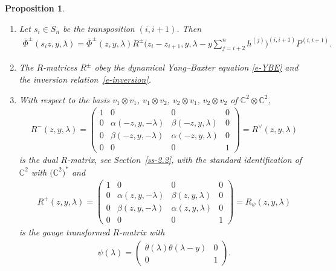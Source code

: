 \documentclass[pdftex]{sigma}
\numberwithin{equation}{section}
\newtheorem{Proposition}[Theorem]{Proposition}
 { \theoremstyle{definition}
\newtheorem{Definition}[Theorem]{Definition}
\newtheorem{Example}[Theorem]{Example}
\newtheorem{Remark}[Theorem]{Remark} }
\begin{document}
\begin{Proposition}\label{prop-3}\quad
\begin{enumerate}\itemsep=0pt
 \item[$(i)$] Let $s_i\in S_n$ be the transposition $(i,i+1)$. Then
 \begin{gather*}
 \bar\Phi^\pm(s_iz,y, \lambda) =\bar\Phi^\pm(z,y,\lambda) R^\pm\bigg(z_i-z_{i+1},y,\lambda -y\sum_{j=i+2}^nh^{(j)}\bigg)^{(i,i+1)}P^{(i,i+1)}.
 \end{gather*}
 \item[$(ii)$] The $R$-matrices $R^\pm$ obey the dynamical Yang--Baxter equation \eqref{e-YBE} and the inversion relation~\eqref{e-inversion}.
 \item[$(iii)$] With respect to the basis $v_1\otimes v_1$, $v_1\otimes v_2$, $v_2\otimes v_1$, $v_2\otimes v_2$ of $\mathbb C^2\otimes \mathbb C^2$,
 \begin{gather*}
 R^-(z,y,\lambda)= \left(
 \begin{matrix}
 1 & 0 & 0 & 0\\
 0 & \alpha(-z,y,-\lambda) & \beta(-z,y,\lambda) & 0\\
 0 & \beta(-z,y,-\lambda) & \alpha(-z,y,\lambda) & 0\\
 0 & 0 & 0& 1
 \end{matrix}
 \right)=R^\vee(z,y,\lambda)
 \end{gather*}
 is the dual $R$-matrix, see Section~{\rm \ref{ss-2.2}}, with the standard identification of $\mathbb C^2$ with $\big(\mathbb C^2\big)^*$ and
 \begin{gather*}
 R^+(z,y,\lambda)= \left(
 \begin{matrix}
 1 & 0 & 0 & 0\\
 0 & \alpha(z,y,-\lambda) & \beta(z,y,\lambda) & 0\\
 0 & \beta(z,y,-\lambda) & \alpha(z,y,\lambda) & 0\\
 0 & 0 & 0& 1
 \end{matrix}
 \right)= R_\psi(z,y,\lambda)
 \end{gather*}
 is the gauge transformed $R$-matrix with
 \begin{gather*}
 \psi(\lambda)=\left(
 \begin{matrix}
 \theta(\lambda)\theta(\lambda-y) & 0 \\
 0 & 1
 \end{matrix}
 \right).
 \end{gather*}
 \end{enumerate}
\end{Proposition}
\end{document}
